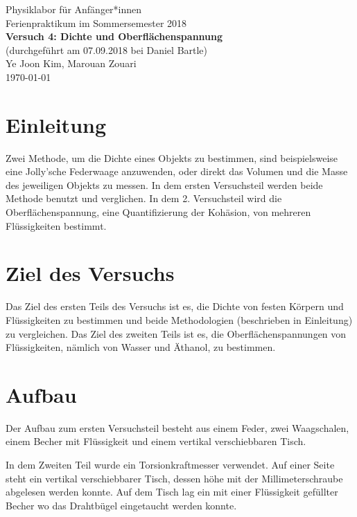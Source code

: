 \documentclass[11pt,a4paper]{article} %
\begin{document}
{
	\centering 
	\large 
	Physiklabor für Anfänger*innen \\
	Ferienpraktikum im Sommersemester 2018 \\[4mm]
	\textbf{\LARGE 
		Versuch 4: Dichte und Oberflächenspannung
	} \\[3mm]
	(durchgeführt am 07.09.2018 bei Daniel Bartle) \\
	Ye Joon Kim, Marouan Zouari\\
	\today \\[10mm]
}


\section{Einleitung}
Zwei Methode, um die Dichte eines Objekts zu bestimmen, sind beispielsweise eine Jolly'sche Federwaage anzuwenden, oder direkt das Volumen und die Masse des jeweiligen Objekts zu messen. In dem ersten Versuchsteil werden beide Methode benutzt und verglichen. In dem 2. Versuchsteil wird die Oberflächenspannung, eine Quantifizierung der Kohäsion, von mehreren Flüssigkeiten bestimmt. 
\section{Ziel des Versuchs}
Das Ziel des ersten Teils des Versuchs ist es, die Dichte von festen Körpern und Flüssigkeiten zu bestimmen und beide Methodologien (beschrieben in Einleitung) zu vergleichen. Das Ziel des zweiten Teils ist es, die Oberflächenspannungen von Flüssigkeiten, nämlich von Wasser und Äthanol, zu bestimmen. 

\section{Aufbau}
Der Aufbau zum ersten Versuchsteil besteht aus einem Feder, zwei Waagschalen, einem Becher mit Flüssigkeit und einem vertikal verschiebbaren Tisch. 

In dem Zweiten Teil wurde ein Torsionkraftmesser verwendet. Auf einer Seite steht ein vertikal verschiebbarer Tisch, dessen höhe mit der Millimeterschraube abgelesen werden konnte. Auf dem Tisch lag ein mit einer Flüssigkeit gefüllter Becher wo das Drahtbügel eingetaucht werden konnte. 
\end{document}
